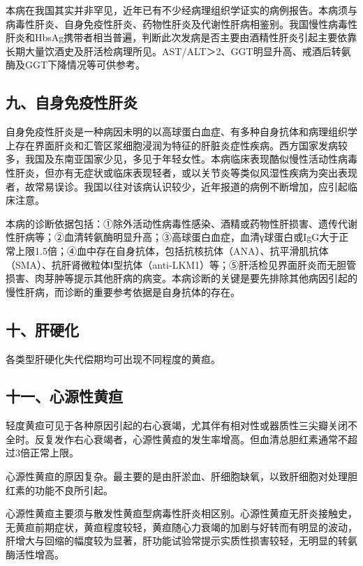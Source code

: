 本病在我国其实并非罕见，近年已有不少经病理组织学证实的病例报告。本病须与病毒性肝炎、自身免疫性肝炎、药物性肝炎及代谢性肝病相鉴别。我国慢性病毒性肝炎和HbsAg携带者相当普遍，判断此次发病是否主要由酒精性肝炎引起主要依靠长期大量饮酒史及肝活检病理所见。AST/ALT＞2、GGT明显升高、戒酒后转氨酶及GGT下降情况等可供参考。

\subsection{九、自身免疫性肝炎}

自身免疫性肝炎是一种病因未明的以高球蛋白血症、有多种自身抗体和病理组织学上存在界面肝炎和汇管区浆细胞浸润为特征的肝脏炎症性疾病。西方国家发病较多，我国及东南亚国家少见，多见于年轻女性。本病临床表现酷似慢性活动性病毒性肝炎，但亦有无症状或临床表现轻者，或以关节炎等类似风湿性疾病为突出表现者，故常易误诊。我国以往对该病认识较少，近年报道的病例不断增加，应引起临床注意。

本病的诊断依据包括：①除外活动性病毒性感染、酒精或药物性肝损害、遗传代谢性肝病等；②血清转氨酶明显升高；③高球蛋白血症，血清γ球蛋白或IgG大于正常上限1.5倍；④血中存在自身抗体，包括抗核抗体（ANA）、抗平滑肌抗体（SMA）、抗肝肾微粒体Ⅰ型抗体（anti-LKM1）等；⑤肝活检见界面肝炎而无胆管损害、肉芽肿等提示其他肝病的病变。本病诊断的关键是要先排除其他病因引起的慢性肝病，而诊断的重要参考依据是自身抗体的存在。

\subsection{十、肝硬化}

各类型肝硬化失代偿期均可出现不同程度的黄疸。

\subsection{十一、心源性黄疸}

轻度黄疸可见于各种原因引起的右心衰竭，尤其伴有相对性或器质性三尖瓣关闭不全时。反复发作右心衰竭者，心源性黄疸的发生率增高。但血清总胆红素通常不超过3倍正常上限。

心源性黄疸的原因复杂。最主要的是由肝淤血、肝细胞缺氧，以致肝细胞对处理胆红素的功能不良所引起。

心源性黄疸主要须与散发性黄疸型病毒性肝炎相区别。心源性黄疸无肝炎接触史，无黄疸前期症状，黄疸程度较轻，黄疸随心力衰竭的加剧与好转而有明显的波动，肝增大与回缩的幅度较为显著，肝功能试验常提示实质性损害较轻，无明显的转氨酶活性增高。

\protect\hypertarget{text00215.html}{}{}

